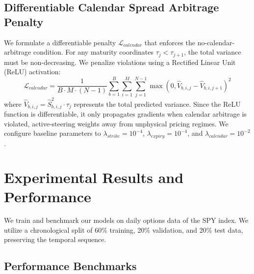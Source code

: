 \documentclass[conference]{IEEEtran}
\begin{document}
\subsection{Differentiable Calendar Spread Arbitrage Penalty}
We formulate a differentiable penalty $\mathcal{L}_{calendar}$ that enforces the no-calendar-arbitrage condition. For any maturity coordinates $\tau_{j} < \tau_{j+1}$, the total variance must be non-decreasing. We penalize violations using a Rectified Linear Unit (ReLU) activation:
\begin{equation}
\mathcal{L}_{calendar} = \frac{1}{B \cdot M \cdot (N-1)} \sum_{b=1}^B \sum_{i=1}^M \sum_{j=1}^{N-1} \max\left(0, \hat{V}_{b,i,j} - \hat{V}_{b,i,j+1}\right)^2
\end{equation}
where $\hat{V}_{b,i,j} = \hat{S}_{b,i,j}^2 \cdot \tau_j$ represents the total predicted variance. Since the ReLU function is differentiable, it only propagates gradients when calendar arbitrage is violated, active-steering weights away from unphysical pricing regimes. We configure baseline parameters to $\lambda_{strike} = 10^{-4}$, $\lambda_{expiry} = 10^{-4}$, and $\lambda_{calendar} = 10^{-2}$.

\section{Experimental Results and Performance}

We train and benchmark our models on daily options data of the SPY index. We utilize a chronological split of 60\% training, 20\% validation, and 20\% test data, preserving the temporal sequence.

\subsection{Performance Benchmarks}
\end{document}
